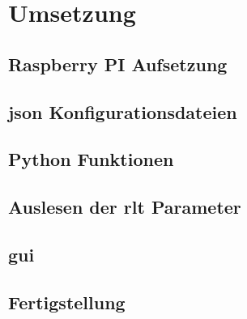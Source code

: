\chapter{Umsetzung}

\section{Raspberry PI Aufsetzung}
\setAuthor{\pezze}


\setAuthor{\mangeng}


\section{\acs{json} Konfigurationsdateien}
\setAuthor{\pezze}



\setAuthor{\schneider}


\section{Python Funktionen}
\setAuthor{\pezze}


\section{Auslesen der \acs{rlt} Parameter}
\setAuthor{\schneider}


\section{\acf{gui}}
\setAuthor{\pezze}



\section{Fertigstellung}
\setAuthor{\schneider}


\setAuthor{\pezze}


